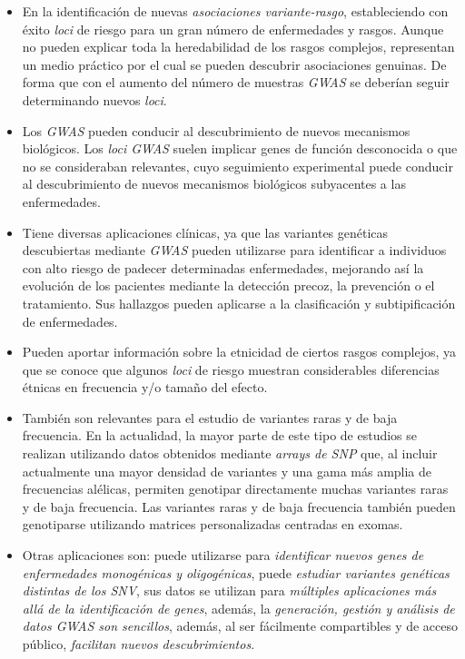 \documentclass[IB,BIB]{TFUOC}%
\begin{document}
\begin{itemize}
    \item En la identificación de nuevas \textit{asociaciones variante-rasgo}, estableciendo con éxito \textit{loci} de riesgo para un gran número de enfermedades y rasgos. Aunque no pueden explicar toda la heredabilidad de los rasgos complejos, representan un medio práctico por el cual se pueden descubrir asociaciones genuinas. De forma que con el aumento del número de muestras \textit{GWAS} se deberían seguir determinando nuevos \textit{loci}.
    \item Los \textit{GWAS} pueden conducir al descubrimiento de nuevos mecanismos biológicos. Los \textit{loci GWAS} suelen implicar genes de función desconocida o que no se consideraban relevantes, cuyo seguimiento experimental puede conducir al descubrimiento de nuevos mecanismos biológicos subyacentes a las enfermedades.
    \item Tiene diversas aplicaciones clínicas, ya que las variantes genéticas descubiertas mediante \textit{GWAS} pueden utilizarse para identificar a individuos con alto riesgo de padecer determinadas enfermedades, mejorando así la evolución de los pacientes mediante la detección precoz, la prevención o el tratamiento. Sus hallazgos pueden aplicarse a la clasificación y subtipificación de enfermedades.
    \item Pueden aportar información sobre la etnicidad de ciertos rasgos complejos, ya que se conoce que algunos \textit{loci} de riesgo muestran considerables diferencias étnicas en frecuencia y/o tamaño del efecto.
    \item También son relevantes para el estudio de variantes raras y de baja frecuencia. En la actualidad, la mayor parte de este tipo de estudios se realizan utilizando datos obtenidos mediante \textit{arrays de SNP} que, al incluir actualmente una mayor densidad de variantes y una gama más amplia de frecuencias alélicas, permiten genotipar directamente muchas variantes raras y de baja frecuencia. Las variantes raras y de baja frecuencia también pueden genotiparse utilizando matrices personalizadas centradas en exomas.
    \item Otras aplicaciones son: puede utilizarse para \textit{identificar nuevos genes de enfermedades monogénicas y oligogénicas}, puede \textit{estudiar variantes genéticas distintas de los SNV}, sus datos se utilizan para \textit{múltiples aplicaciones más allá de la identificación de genes}, además, la \textit{generación, gestión y análisis de datos GWAS son sencillos}, además, al ser fácilmente compartibles y de acceso público, \textit{facilitan nuevos descubrimientos}.
\end{itemize}
\end{document}
